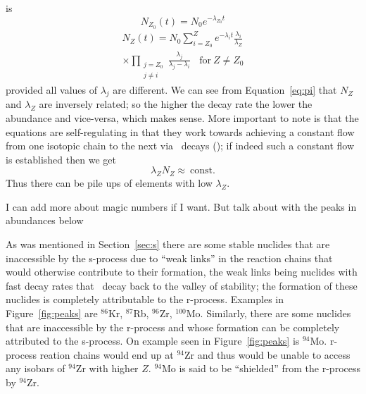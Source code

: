 {\cite{iliadis2008} is
\begin{equation}
N_{Z_0}(t) = N_0 e^{-\lambda_{Z_0} t}
\end{equation}
\begin{multline}
\label{eq:pi}
N_Z(t) = N_0 \sum_{i=Z_0}^Z e^{-\lambda_i
  t}\frac{\lambda_i}{\lambda_Z} \\
\times \prod_{\substack{j=Z_0\\ j\neq i}} \frac{\lambda_j}{\lambda_j -
  \lambda_i}~~~~\textrm{for}~Z\neq Z_0
\end{multline}
provided all values of $\lambda_j$ are different.  
We can see from Equation~\ref{eq:pi} that $N_Z$ and $\lambda_Z$ are
inversely related; so the higher the decay rate the lower the
abundance and vice-versa, which makes sense.  More important to note
is that the equations are self-regulating in that they work towards
achieving a constant flow from one isotopic chain to the next via
\bminus\ decays (\citealt{iliadis2008}); if indeed such a constant
flow is established then we get
\begin{equation}
\lambda_ZN_Z \approx ~ \textrm{const}.
\end{equation}
Thus there can be pile ups of elements with low $\lambda_Z$.

I can add more about magic numbers if I want.  But talk about with the
peaks in abundances below

As was mentioned in Section~\ref{sec:s} there are some stable nuclides
that are inaccessible by the s-process due to ``weak links'' in the
reaction chains that would otherwise contribute to their formation,
the weak links being nuclides with fast decay rates that \bminus\
decay back to the valley of stability; the formation of these nuclides
is completely attributable to the r-process.  Examples in
Figure~\ref{fig:peaks} are $^{86}$Kr,  $^{87}$Rb,  $^{96}$Zr,
$^{100}$Mo.  Similarly, there are
some nuclides that are inaccessible by the r-process and whose
formation can be completely attributed to the s-process.  On example
seen in Figure~\ref{fig:peaks} is $^{94}$Mo.  r-process reation chains would end up at $^{94}$Zr and
thus would be unable to access any isobars of $^{94}$Zr with higher $Z$.  $^{94}$Mo
is said to be ``shielded'' from the r-process by $^{94}$Zr.



}
